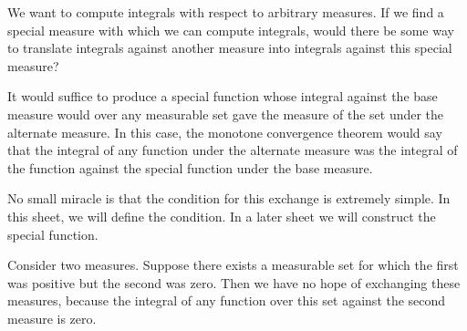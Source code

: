 
\sbasic


































\sstart
{}


We want to compute integrals
with respect to arbitrary measures.
If we find a special measure
with which we can compute integrals,
would there
be some way to translate
integrals against another measure
into integrals against this special
measure?

It would suffice to produce a special function
whose integral against the base measure
would over any measurable set gave
the measure of the set under the alternate
measure.
In this case, the monotone convergence
theorem would say that the integral of
any function under the alternate
measure was the integral of the function
against the special function under the
base measure.

No small miracle is that the condition
for this exchange is extremely simple.
In this sheet, we will define the
condition. In a later sheet we will
construct the special function.


Consider two measures.
Suppose there exists
a measurable set for which the first
was positive but the second was zero.
Then we have no hope of exchanging
these measures, because the integral
of any function over this set against
the second measure is zero.

